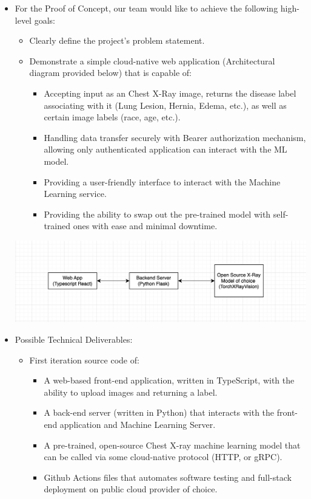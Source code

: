 \documentclass{article}
\begin{document}
\begin{itemize}
    \item For the Proof of Concept, our team would like to achieve the following high-level goals:
    \begin{itemize}
        \item Clearly define the project's problem statement.
        \item Demonstrate a simple cloud-native web application (Architectural diagram provided below) that is capable of:
        \begin{itemize}
            \item Accepting input as an Chest X-Ray image, returns the disease label associating with it (Lung Lesion, Hernia, Edema, etc.), as well as certain image labels (race, age, etc.).
            \item Handling data transfer securely with Bearer authorization mechanism, allowing only authenticated application can interact with the ML model.
            \item Providing a user-friendly interface to interact with the Machine Learning service.
            \item Providing the ability to swap out the pre-trained model with self-trained ones with ease and minimal downtime.
        \end{itemize}
    \end{itemize}
    \includegraphics[scale=0.45]{poc-architectural-diagram.png}
    
    \item Possible Technical Deliverables:
    \begin{itemize}
        \item First iteration source code of:
        \begin{itemize}
            \item A web-based front-end application, written in TypeScript, with the ability to upload images and returning a label.
            \item A back-end server (written in Python) that interacts with the front-end application and Machine Learning Server.
            \item A pre-trained, open-source Chest X-ray machine learning model that can be called via some cloud-native protocol (HTTP, or gRPC).
            \item Github Actions files that automates software testing and full-stack deployment on public cloud provider of choice.
        \end{itemize}
    \end{itemize}
\end{itemize}
\end{document}
